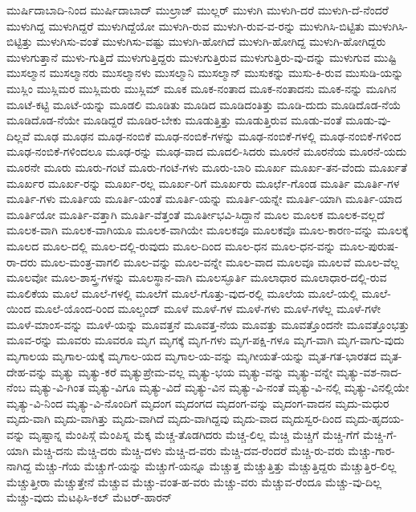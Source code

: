 {ಮುರ್ಷಿದಾಬಾದಿ-ನಿಂದ
ಮುರ್ಷಿದಾಬಾದ್
ಮುಲ್ರಾಜ್
ಮುಲ್ಲರ್
ಮುಳುಗಿ
ಮುಳುಗಿ-ದರೆ
ಮುಳುಗಿ-ದೆ-ನೆಂದರೆ
ಮುಳುಗಿದ್ದ
ಮುಳುಗಿದ್ದರೆ
ಮುಳುಗಿದ್ದೆಯೋ
ಮುಳುಗಿ-ರುವ
ಮುಳುಗಿ-ರುವ-ವ-ರನ್ನು
ಮುಳುಗಿಸಿ-ಬಿಟ್ಟಿತು
ಮುಳುಗಿಸಿ-ಬಿಟ್ಟಿತ್ತು
ಮುಳುಗಿಸು-ವಂತೆ
ಮುಳುಗಿಸು-ವಷ್ಟು
ಮುಳುಗಿ-ಹೋಗಿದೆ
ಮುಳುಗಿ-ಹೋಗಿದ್ದ
ಮುಳುಗಿ-ಹೋಗಿದ್ದರು
ಮುಳುಗುತ್ತಾನೆ
ಮುಳು-ಗುತ್ತಿದೆ
ಮುಳುಗುತ್ತಿದ್ದರು
ಮುಳುಗುತ್ತಿರುವ
ಮುಳುಗುತ್ತಿರು-ವು-ದನ್ನು
ಮುಳುಗುವ
ಮುಷ್ಟಿ
ಮುಸಲ್ಮಾನ
ಮುಸಲ್ಮಾನರು
ಮುಸಲ್ಮಾನಳು
ಮುಸಲ್ಮಾನಿ
ಮುಸಲ್ಮಾನ್
ಮುಸುಕನ್ನು
ಮುಸು-ಕಿ-ರುವ
ಮುಸುಡಿ-ಯನ್ನು
ಮುಸ್ಲಿಂ
ಮುಸ್ಲಿಮರ
ಮುಸ್ಲಿಮರು
ಮುಸ್ಲಿಮ್
ಮೂಕ
ಮೂಕ-ನಂತಾದ
ಮೂಕ-ನಂತಾದನು
ಮೂಕ-ನನ್ನು
ಮೂಗಿನ
ಮೂಟೆ-ಕಟ್ಟಿ
ಮೂಟೆ-ಯನ್ನು
ಮೂಡಲಿ
ಮೂಡಿತು
ಮೂಡಿದ
ಮೂಡಿದಂತಿತ್ತು
ಮೂಡಿ-ದುದು
ಮೂಡಿದೊಡ-ನೆಯೆ
ಮೂಡಿದೊಡ-ನೆಯೇ
ಮೂಡಿದ್ದರೆ
ಮೂಡಿರ-ಬೇಕು
ಮೂಡುತ್ತಿತ್ತು
ಮೂಡುತ್ತಿರುವ
ಮೂಡು-ವಂತೆ
ಮೂಡು-ವು-ದಿಲ್ಲವೆ
ಮೂಢ
ಮೂಢನ
ಮೂಢ-ನಂಬಿಕೆ
ಮೂಢ-ನಂಬಿಕೆ-ಗಳನ್ನು
ಮೂಢ-ನಂಬಿಕೆ-ಗಳಲ್ಲಿ
ಮೂಢ-ನಂಬಿಕೆ-ಗಳಿಂದ
ಮೂಢ-ನಂಬಿಕೆ-ಗಳಿಂದಲೂ
ಮೂಢ-ರನ್ನು
ಮೂಢ-ವಾದ
ಮೂದಲಿ-ಸಿದರು
ಮೂರನೆ
ಮೂರನೆಯ
ಮೂರನೆ-ಯದು
ಮೂರನೇ
ಮೂರು
ಮೂರು-ಗಂಟೆ
ಮೂರು-ಗಂಟೆ-ಗಳು
ಮೂರು-ಬಾರಿ
ಮೂರ್ಖ
ಮೂರ್ಖ-ತನ-ವೆಂದು
ಮೂರ್ಖತೆ
ಮೂರ್ಖರ
ಮೂರ್ಖ-ರನ್ನು
ಮೂರ್ಖ-ರಲ್ಲ
ಮೂರ್ಖ-ರಿಗೆ
ಮೂರ್ಖರು
ಮೂರ್ಛೆ-ಗೊಂಡ
ಮೂರ್ತಿ
ಮೂರ್ತಿ-ಗಳ
ಮೂರ್ತಿ-ಗಳು
ಮೂರ್ತಿಯ
ಮೂರ್ತಿ-ಯಂತೆ
ಮೂರ್ತಿ-ಯನ್ನು
ಮೂರ್ತಿ-ಯನ್ನೇ
ಮೂರ್ತಿ-ಯಾಗಿ
ಮೂರ್ತಿ-ಯಾದ
ಮೂರ್ತಿಯೋ
ಮೂರ್ತಿ-ವತ್ತಾಗಿ
ಮೂರ್ತಿ-ವೆತ್ತಂತೆ
ಮೂರ್ತೀಭವಿ-ಸಿದ್ದಾನೆ
ಮೂಲ
ಮೂಲಕ
ಮೂಲಕ-ವಲ್ಲದೆ
ಮೂಲಕ-ವಾಗಿ
ಮೂಲಕ-ವಾಗಿಯೂ
ಮೂಲಕ-ವಾಗಿಯೇ
ಮೂಲಕವೂ
ಮೂಲಕವೊ
ಮೂಲ-ಕಾರಣ-ವನ್ನು
ಮೂಲಕ್ಕೆ
ಮೂಲದ
ಮೂಲ-ದಲ್ಲಿ
ಮೂಲ-ದಲ್ಲಿ-ರುವುದು
ಮೂಲ-ದಿಂದ
ಮೂಲ-ಧನ
ಮೂಲ-ಧನ-ವನ್ನು
ಮೂಲ-ಪುರುಷ-ರಾ-ದರು
ಮೂಲ-ಮಂತ್ರ-ವಾಗಲಿ
ಮೂಲ-ವನ್ನು
ಮೂಲ-ವನ್ನೇ
ಮೂಲ-ವಾದ
ಮೂಲವೂ
ಮೂಲವೆ
ಮೂಲ-ವೆಲ್ಲ
ಮೂಲವೋ
ಮೂಲ-ಶಾಸ್ತ್ರ-ಗಳನ್ನು
ಮೂಲಸ್ಥಾನ-ವಾಗಿ
ಮೂಲಸ್ಫೂರ್ತಿ
ಮೂಲಾಧಾರ
ಮೂಲಾಧಾರ-ದಲ್ಲಿ-ರುವ
ಮೂಲಿಕೆಯ
ಮೂಲೆ
ಮೂಲೆ-ಗಳಲ್ಲಿ
ಮೂಲೆಗೆ
ಮೂಲೆ-ಗೊತ್ತು-ವುದ-ರಲ್ಲಿ
ಮೂಲೆಯ
ಮೂಲೆ-ಯಲ್ಲಿ
ಮೂಲೆ-ಯಿಂದ
ಮೂಲೆ-ಯೊಂದ-ರಿಂದ
ಮೂಲ್ಚಂದ್
ಮೂಳೆ
ಮೂಳೆ-ಗಳ
ಮೂಳೆ-ಗಳು
ಮೂಳೆ-ಗಳೆಲ್ಲ
ಮೂಳೆ-ಗಳೇ
ಮೂಳೆ-ಮಾಂಸ-ವನ್ನು
ಮೂಳೆ-ಯನ್ನು
ಮೂವತ್ತನೆ
ಮೂವತ್ತ-ನೆಯ
ಮೂವತ್ತು
ಮೂವತ್ತೊಂದನೇ
ಮೂವತ್ತೊಂಭತ್ತು
ಮೂವ-ರನ್ನು
ಮೂವರು
ಮೂವರೂ
ಮೃಗ
ಮೃಗಕ್ಕೆ
ಮೃಗ-ಗಳು
ಮೃಗ-ಪಕ್ಷಿ-ಗಳೂ
ಮೃಗ-ವಾಗಿ
ಮೃಗ-ವಾಗು-ವುದು
ಮೃಗಾಲಯ
ಮೃಗಾಲ-ಯಕ್ಕೆ
ಮೃಗಾಲ-ಯದ
ಮೃಗಾಲ-ಯ-ವನ್ನು
ಮೃಗೀಯತೆ-ಯನ್ನು
ಮೃತ-ಗತ-ಭಾರತದ
ಮೃತ-ದೇಹ-ವನ್ನು
ಮೃತ್ಯು
ಮೃತ್ಯು-ಕರೆ
ಮೃತ್ಯುಪ್ರೇಮ-ವಲ್ಲ
ಮೃತ್ಯು-ಭಯ
ಮೃತ್ಯು-ವನ್ನು
ಮೃತ್ಯು-ವನ್ನೇ
ಮೃತ್ಯು-ವಶ-ನಾದ-ನೆಂಬ
ಮೃತ್ಯು-ವಿ-ಗಿಂತ
ಮೃತ್ಯು-ವಿಗೂ
ಮೃತ್ಯು-ವಿದೆ
ಮೃತ್ಯು-ವಿನ
ಮೃತ್ಯು-ವಿ-ನಂತೆ
ಮೃತ್ಯು-ವಿ-ನಲ್ಲಿ
ಮೃತ್ಯು-ವಿನಲ್ಲಿಯೇ
ಮೃತ್ಯು-ವಿ-ನಿಂದ
ಮೃತ್ಯು-ವಿ-ನೊಂದಿಗೆ
ಮೃದಂಗ
ಮೃದಂಗದ
ಮೃದಂಗ-ವನ್ನು
ಮೃದಂಗ-ವಾದನ
ಮೃದು-ಮಧುರ
ಮೃದು-ವಾಗಿ
ಮೃದು-ವಾಗಿತ್ತು
ಮೃದು-ವಾಗಿದೆ
ಮೃದು-ವಾಗಿದ್ದವು
ಮೃದು-ವಾದ
ಮೃದುಸ್ವರ-ದಿಂದ
ಮೃದು-ಹೃದಯ-ವನ್ನು
ಮೃಷ್ಟಾನ್ನ
ಮೆಂಪಿಸ್ಗೆ
ಮೆಂಪಿಸ್ನ
ಮೆಕ್ಕ
ಮೆಚ್ಚ-ತೊಡಗಿದರು
ಮೆಚ್ಚ-ಲಿಲ್ಲ
ಮೆಚ್ಚಿ
ಮೆಚ್ಚಿಗೆ
ಮೆಚ್ಚಿ-ಗೆಗೆ
ಮೆಚ್ಚಿ-ಗೆ-ಯಾಗಿ
ಮೆಚ್ಚಿ-ದನು
ಮೆಚ್ಚಿ-ದರು
ಮೆಚ್ಚಿ-ದಳು
ಮೆಚ್ಚಿ-ದ-ವರು
ಮೆಚ್ಚಿ-ದವ-ರೆಂದರೆ
ಮೆಚ್ಚಿ-ರು-ವರು
ಮೆಚ್ಚು-ಗಾರ-ನಾಗಿದ್ದ
ಮೆಚ್ಚು-ಗೆಯ
ಮೆಚ್ಚುಗೆ-ಯನ್ನು
ಮೆಚ್ಚುಗೆ-ಯನ್ನೂ
ಮೆಚ್ಚುತ್ತ
ಮೆಚ್ಚುತ್ತಿತ್ತು
ಮೆಚ್ಚುತ್ತಿದ್ದರು
ಮೆಚ್ಚುತ್ತಿರ-ಲಿಲ್ಲ
ಮೆಚ್ಚುತ್ತೀರಾ
ಮೆಚ್ಚುತ್ತೇನೆ
ಮೆಚ್ಚುವ
ಮೆಚ್ಚು-ವಂತ-ಹ-ವರು
ಮೆಚ್ಚು-ವರು
ಮೆಚ್ಚುವ-ರೆಂದೂ
ಮೆಚ್ಚು-ವು-ದಿಲ್ಲ
ಮೆಚ್ಚು-ವುದು
ಮೆಟಫಿಸಿ-ಕಲ್
ಮೆಟರ್-ಹಾರನ್
}
